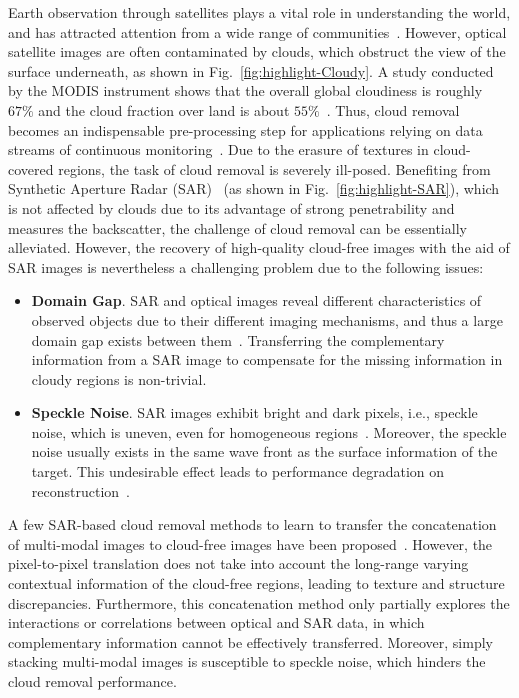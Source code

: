 \documentclass[a4paper,fleqn]{cas-dc}
\newcommand{\ie}[1]{{i.e.}}
\begin{document}
Earth observation through satellites plays a vital role in understanding the world, and has attracted attention from a wide range of communities~\citep{xia2018dota,requena2021earthnet2021,girard2021polygonal}. However, optical satellite images are often contaminated by clouds, which obstruct the view of the surface underneath, as shown in Fig.~\ref{fig:highlight-Cloudy}.
A study conducted by the MODIS instrument shows that the overall global cloudiness is roughly $67\%$ and the cloud fraction over land is about $55\%$~\citep{king2013spatial}.
Thus, cloud removal becomes an indispensable pre-processing step for applications relying on data streams of continuous monitoring~\citep{ebel2020multisensor}. 
Due to the erasure of textures in cloud-covered regions, the task of cloud removal is severely ill-posed. 
Benefiting from Synthetic Aperture Radar (SAR)~\citep{bamler2000principles} (as shown in Fig.~\ref{fig:highlight-SAR}), which is not affected by clouds due to its advantage of strong penetrability and measures the backscatter, the challenge of cloud removal can be essentially alleviated. 
However, the recovery of high-quality cloud-free images with the aid of SAR images is nevertheless a challenging problem due to the following issues:
\begin{itemize}
	\item {\bf Domain Gap}. SAR and optical images reveal different characteristics of observed objects due to their different imaging mechanisms, and thus a large domain gap exists between them~\citep{schmitt2017fusion, liu2018can}. Transferring the complementary information from a SAR image to compensate for the missing information in cloudy regions is non-trivial.
	\item {\bf Speckle Noise}. SAR images exhibit bright and dark pixels, \ie{}, speckle noise, which is uneven, even for homogeneous regions~\citep{yu2018speckle, zhu2021deep}. Moreover, the speckle noise usually exists in the same wave front as the surface information of the target. This undesirable effect leads to performance degradation on reconstruction~\citep{fuentes2019sar, liu2021mrddanet}.
\end{itemize} 

A few SAR-based cloud removal methods to learn to transfer the concatenation of multi-modal images to cloud-free images have been proposed~\citep{gao2020cloud, meraner2020cloud, ebel2020multisensor}. However, the pixel-to-pixel translation does not take into account the long-range varying contextual information of the cloud-free regions, leading to texture and structure discrepancies. Furthermore, this concatenation method only partially explores the interactions or correlations between optical and SAR data, in which complementary information cannot be effectively transferred. Moreover, simply stacking multi-modal images is susceptible to speckle noise, which hinders the cloud removal performance.
\end{document}
